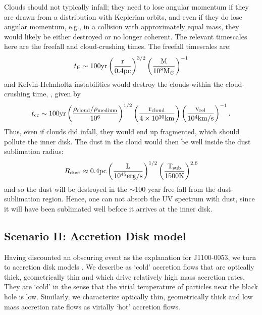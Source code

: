 \documentclass[a4paper,fleqn,usenatbib]{mnras}
\begin{document}
Clouds should not typically infall; they need to lose angular momentum
if they are drawn from a distribution with Keplerian orbits, and even
if they do lose angular momentum, e.g., in a collision with
approximately equal mass, they would likely be either destroyed or no
longer coherent. The relevant timescales here are the freefall and
cloud-crushing times. The freefall timescales are:
\begin{equation}
    t_{{\rm ff}}   \sim 100   \rm{yr}  \left(\frac{r}{0.4\rm{pc}}\right)^{3/2} 
                                            \left(\frac{M}{10^{8}M_{\odot}}\right)^{-1}
\end{equation}
and Kelvin-Helmholtz instabilities would destroy the clouds within the
cloud-crushing time, \citep[e.g., ][]{Nagakura2008, Hopkins2013,
Shiokawa2015, Bae2016}, given by
\begin{equation}
    t_{\rm cc} \sim 100\rm{yr} \left(\frac{\rho_{cloud}/\rho_{medium}}{10^{6}}\right)^{1/2} 
                                            \left(\frac{r_{\rm cloud}}{4 \times 10^{10}\rm{km}}\right) 
                                            \left(\frac{v_{\rm rel}}{10^{4}\rm{km/s}}\right)^{-1}.
\end{equation}
Thus, even if clouds did infall, they would end up fragmented, which
should pollute the inner disk.  The dust in the cloud would then be
well inside the dust sublimation radius:
\begin{equation}
    R_{\rm dust} \approx 0.4\rm{pc}\left(\frac{L}{10^{45}\rm{erg/s}}\right)^{1/2}
                                                   \left(\frac{T_{\rm sub}}{1500\rm{K}}\right)^{2.6}
\end{equation}
and so the dust will be destroyed in the $\sim$100 year free-fall from
the dust-sublimation region. Hence, one can not absorb the UV spectrum
with dust, since it will have been sublimated well before it arrives
at the inner disk.


\subsection{Scenario II: Accretion Disk model}
Having discounted an obscuring event as the explanation for
J1100-0053, we turn to accretion disk models \citep[see also the
recent review by ][]{YuanNarayan2014}. We describe as `cold' accretion
flows that are optically thick, geometrically thin and which drive
relatively high mass accretion rates. They are `cold' in the sense
that the virial temperature of particles near the black hole is
low. Similarly, we characterize optically thin, geometrically thick
and low mass accretion rate flows as virially `hot' accretion flows.
\end{document}
